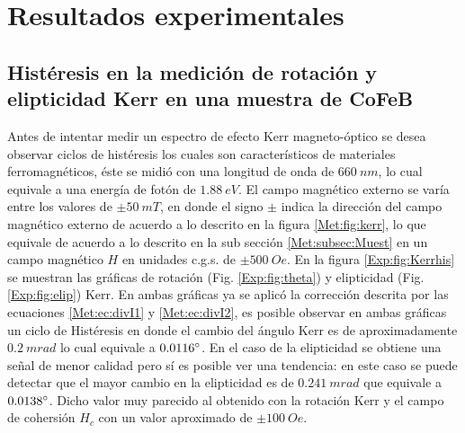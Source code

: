 \chapter{Resultados experimentales} \label{cap:exp}
\section{Hist\'eresis en la medici\'on de rotaci\'on y elipticidad Kerr en una muestra de  CoFeB} \label{Exp:sec:hist}
Antes de intentar medir un espectro de efecto Kerr magneto-\'optico se desea observar ciclos de hist\'eresis los cuales son caracter\'isticos de materiales ferromagn\'eticos, \'este se midi\'o  con una longitud de onda de $660~nm$, lo cual equivale a una energ\'ia de fot\'on de $1.88~eV $. El campo magn\'etico externo se var\'ia entre los valores de $\pm 50~mT$, en donde el signo $\pm$ indica la direcci\'on del campo magn\'etico externo de acuerdo a lo descrito en la figura \ref{Met:fig:kerr}, lo que equivale de acuerdo a lo descrito en la sub secci\'on \ref{Met:subsec:Muest} en un campo magn\'etico $H$ en unidades c.g.s. de $\pm 500~ Oe$. En la figura \ref{Exp:fig:Kerrhis} se muestran las gr\'aficas de rotaci\'on (Fig. \ref{Exp:fig:theta}) y  elipticidad (Fig. \ref{Exp:fig:elip}) Kerr. En ambas gr\'aficas ya se aplic\'o la correcci\'on descrita por las ecuaciones \ref{Met:ec:divI1} y \ref{Met:ec:divI2}, es posible observar en ambas gr\'aficas un ciclo de Hist\'eresis en donde el cambio del \'angulo Kerr es de aproximadamente $0.2 ~mrad$ lo cual equivale a $0.0116 \degree$. En el caso de la elipticidad se obtiene una se\~nal de menor calidad pero s\'i es posible ver una tendencia: en este caso se puede detectar que el mayor cambio en la elipticidad es de $0.241~mrad$ que equivale a $0.0138 \degree$. Dicho valor muy parecido al obtenido con la rotaci\'on Kerr y  el campo de cohersi\'on $H_c$ con un valor aproximado de $\pm 100 ~Oe$.

